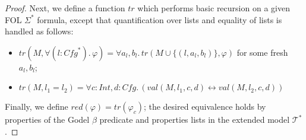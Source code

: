 \begin{proof}
Next, we define a function $\mathit{tr}$ which performs basic recursion on a given FOL $\Sigma^*$ formula,
except that quantification over lists and equality of lists is handled as follows:
\begin{itemize}
    \item $\mathit{tr}(M, \forall (l : \mathit{Cfg}^*).\, \varphi) = \forall a_l, b_l.\, \mathit{tr}(M \cup \{ (l, a_l, b_l) \}, \varphi)$
    for some fresh $a_l,b_l$;
    \item $\mathit{tr}(M, l_1 = l_2) = \forall c : \mathit{Int}, d:\mathit{Cfg}.\, ( \mathit{val}(M, l_1, c, d) \leftrightarrow \mathit{val}(M, l_2, c, d))$
\end{itemize}

Finally, we define $\mathit{red}(\varphi) = \mathit{tr}(\varphi_c)$; the desired equivalence holds by
properties of the Godel $\beta$ predicate and properties lists in the extended model $\mathcal{T}^*$.

\end{proof}